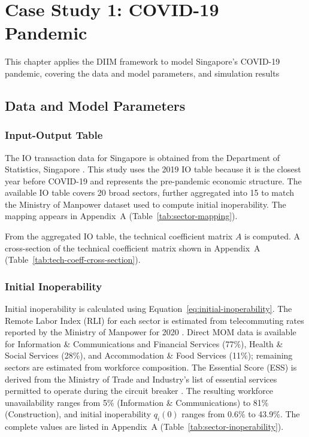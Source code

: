 \chapter{Case Study 1: COVID-19 Pandemic}

This chapter applies the DIIM framework to model Singapore's COVID-19 pandemic, covering the data and model parameters, and simulation results

\section{Data and Model Parameters}

\subsection{Input-Output Table}

The IO transaction data for Singapore is obtained from the Department of Statistics, Singapore \cite{DataGovSgIO2019}. This study uses the 2019 IO table because it is the closest year before COVID-19 and represents the pre-pandemic economic structure. The available IO table covers 20 broad sectors, further aggregated into 15 to match the Ministry of Manpower dataset used to compute initial inoperability. The mapping appears in Appendix~A (Table~\ref{tab:sector-mapping}).

From the aggregated IO table, the technical coefficient matrix $A$ is computed. A cross-section of the technical coefficient matrix shown in Appendix~A (Table~\ref{tab:tech-coeff-cross-section}).

\subsection{Initial Inoperability}

Initial inoperability is calculated using Equation~\eqref{eq:initial-inoperability}. The Remote Labor Index (RLI) for each sector is estimated from telecommuting rates reported by the Ministry of Manpower for 2020 \cite{MOM2020LabourForce}. Direct MOM data is available for Information \& Communications and Financial Services (77\%), Health \& Social Services (28\%), and Accommodation \& Food Services (11\%); remaining sectors are estimated from workforce composition. The Essential Score (ESS) is derived from the Ministry of Trade and Industry's list of essential services permitted to operate during the circuit breaker \cite{MTI2020EssentialServices}. The resulting workforce unavailability ranges from 5\% (Information \& Communications) to 81\% (Construction), and initial inoperability $q_i(0)$ ranges from 0.6\% to 43.9\%. The complete values are listed in Appendix~A (Table~\ref{tab:sector-inoperability}).

